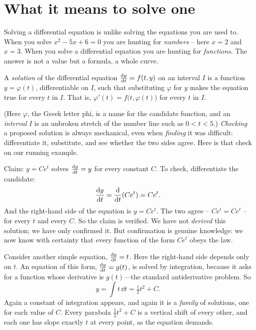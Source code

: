 \section{What it means to solve one}
\label{ch36:sec-solve}

Solving a differential equation is unlike solving the equations you are used to. When you solve $x^2 - 5x + 6 = 0$ you are hunting for \emph{numbers} -- here $x=2$ and $x=3$. When you solve a differential equation you are hunting for \emph{functions}. The answer is not a value but a formula, a whole curve.

\begin{definition}
\label{ch36:def-solution}
A \emph{solution} of the differential equation $\frac{\mathrm{d} y}{\mathrm{d} t} = f(t,y)$ on an interval $I$ is a function $y = \varphi(t)$, differentiable on $I$, such that substituting $\varphi$ for $y$ makes the equation true for every $t$ in $I$. That is, $\varphi'(t) = f\big(t, \varphi(t)\big)$ for every $t$ in $I$.
\end{definition}

(Here $\varphi$, the Greek letter phi, is a name for the candidate function, and an \emph{interval} $I$ is an unbroken stretch of the number line such as $0 < t < 5$.) \emph{Checking} a proposed solution is always mechanical, even when \emph{finding} it was difficult: differentiate it, substitute, and see whether the two sides agree. Here is that check on our running example.

\begin{example}
\label{ch36:ex-verify}
Claim: $y = Ce^t$ solves $\frac{\mathrm{d} y}{\mathrm{d} t} = y$ for every constant $C$. To check, differentiate the candidate:
\[
  \frac{\mathrm{d} y}{\mathrm{d} t} = \frac{\mathrm{d}}{\mathrm{d} t}(Ce^t) = Ce^t.
\]
And the right-hand side of the equation is $y = Ce^t$. The two agree -- $Ce^t = Ce^t$ -- for every $t$ and every $C$. So the claim is verified. We have not \emph{derived} this solution; we have only confirmed it. But confirmation is genuine knowledge: we now know with certainty that every function of the form $Ce^t$ obeys the law.
\end{example}

\begin{example}
\label{ch36:ex-integrate}
Consider another simple equation, $\frac{\mathrm{d} y}{\mathrm{d} t} = t$. Here the right-hand side depends only on $t$. An equation of this form, $\frac{\mathrm{d} y}{\mathrm{d} t} = g(t)$, is solved by integration, because it asks for a function whose derivative is $g(t)$---the standard antiderivative problem. So
\[
  y = \int t \,\dd t = \tfrac{1}{2}t^2 + C.
\]
Again a constant of integration appears, and again it is a \emph{family} of solutions, one for each value of $C$. Every parabola $\tfrac{1}{2}t^2 + C$ is a vertical shift of every other, and each one has slope exactly $t$ at every point, as the equation demands.
\end{example}

